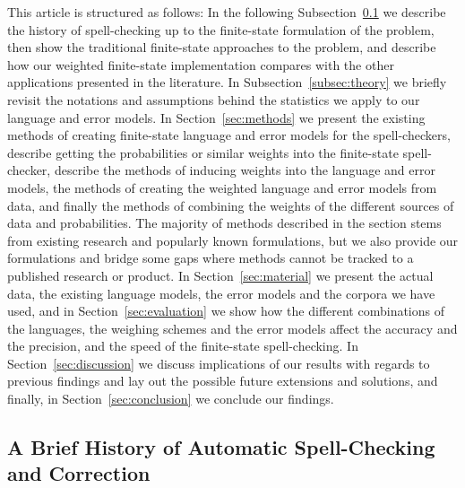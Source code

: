 \documentclass[a4paper,12pt]{article}
\begin{document}
This article is structured as follows: In the following
Subsection~\ref{subsec:background} we describe the history of spell-checking up
to the finite-state formulation of the problem, then show the traditional
finite-state approaches to the problem, and describe how our weighted
finite-state implementation compares with the other applications presented in
the literature.  In Subsection~\ref{subsec:theory} we briefly revisit the
notations and assumptions behind the statistics we apply to our language and
error models.  In Section~\ref{sec:methods} we present the existing methods of
creating finite-state language and error models for the spell-checkers,
describe getting the probabilities or similar weights into the finite-state
spell-checker, describe the methods of inducing weights into the language and
error models, the methods of creating the weighted language and error models
from data, and finally the methods of combining the weights of the different
sources of data and probabilities. The majority of methods described in the
section stems from existing research and popularly known formulations, but we
also provide our formulations and bridge some gaps where methods cannot be
tracked to a published research or product. In Section~\ref{sec:material} we
present the actual data, the existing language models, the error models and the
corpora we have used, and in Section~\ref{sec:evaluation} we show how the
different combinations of the languages, the weighing schemes and the error
models affect the accuracy and the precision, and the speed of the finite-state
spell-checking. In Section~\ref{sec:discussion} we discuss implications of our
results with regards to previous findings and lay out the possible future
extensions and solutions, and finally, in Section~\ref{sec:conclusion} we
conclude our findings.

\subsection{A Brief History of Automatic Spell-Checking and Correction}
\label{subsec:background}
\end{document}

